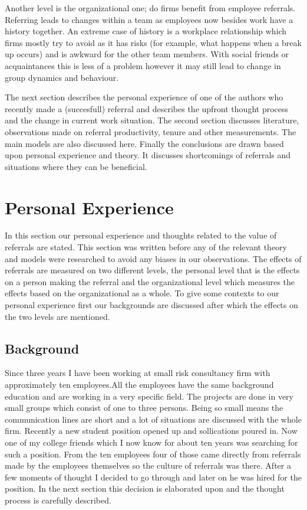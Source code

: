 \documentclass[a4paper, 11pt]{article} %
\begin{document}
Another level is the organizational one; do firms benefit from employee referrals. Referring leads to changes within a team as employees now besides work have a history together. An extreme case of history is a workplace relationship which firms mostly try to avoid as it has risks (for example, what happens when a break up occurs) and is awkward for the other team members. With social friends or acquaintances this is less of a problem however it may still lead to change in group dynamics and behaviour.  

The next section describes the personal experience of one of the authors who recently made a (succesfull) referral and describes the upfront thought process and the change in current work situation. The second section discusses literature, observations made on referral productivity, tenure and other measurements. The main models are also discussed here. Finally the conclusions are drawn based upon personal experience and theory. It discusses shortcomings of referrals and situations where they can be beneficial.


\section*{Personal Experience}
In this section our personal experience and thoughts related to the value of referrals are stated. This section was written before any of the relevant theory and models were researched to avoid any biases in our observations. The effects of referrals are measured on two different levels, the personal level that is the effects on a person making the referral and the organizational level which measures the effects based on the organizational as a whole. To give some contexts to our personal experience first our backgrounds are discussed after which the effects on the two levels are mentioned.

\subsection*{Background}

 Since three years I have been working at small risk consultancy firm with approximately ten employees.All the employees have the same background education and are working in a very specific field. The projects are done in very small groups which consist of one to three persons. Being so small means the communication lines are short and a lot of situations are discussed with the whole firm. Recently a new student position opened up and sollications poured in.  Now one of my college friends which I now know for about ten years was searching for such a position. From the ten employees four of those came directly from referrals made by the employees themselves so the culture of referrals was there. After a few moments of thought I decided to go through and later on he was hired for the position. In the next section this decision is elaborated upon and the thought process is carefully described. 
\end{document}
